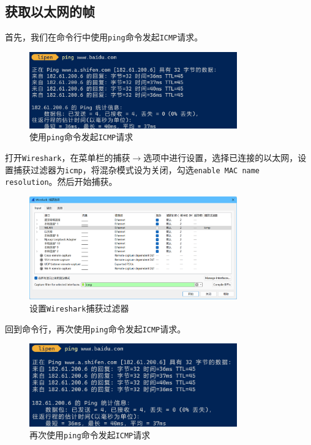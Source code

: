 \documentclass{article}
\begin{document}
\subsection{获取以太网的帧}

首先，我们在命令行中使用\texttt{ping}命令发起\texttt{ICMP}请求。

\begin{figure}[H]
  \centering
  \includegraphics[width=0.8\textwidth]{images/01.png}
  \caption{使用\texttt{ping}命令发起\texttt{ICMP}请求}
\end{figure}

打开\texttt{Wireshark}，在菜单栏的捕获\(\to \)选项中进行设置，选择已连接的以太网，设置捕获过滤器为\texttt{icmp}，将混杂模式设为关闭，勾选\texttt{enable MAC name resolution}。然后开始捕获。

\begin{figure}[H]
  \centering
  \includegraphics[width=0.8\textwidth]{images/02.png}
  \caption{设置\texttt{Wireshark}捕获过滤器}
\end{figure}

回到命令行，再次使用\texttt{ping}命令发起\texttt{ICMP}请求。

\begin{figure}[H]
  \centering
  \includegraphics[width=0.8\textwidth]{images/03.png}
  \caption{再次使用\texttt{ping}命令发起\texttt{ICMP}请求}
\end{figure}
\end{document}
